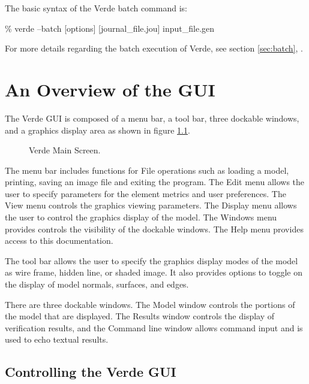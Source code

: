 \documentclass[10pt]{report}
\begin{document}
The basic syntax of the Verde batch command is:

\begin{center}
\% verde --batch [options] [journal\_file.jou] input\_file.gen 
\end{center}

For more details regarding the batch execution of Verde, see 
section \ref{sec:batch},
.


\chapter{An Overview of the GUI}
\label{sec:overview}

The Verde GUI is composed of a menu bar, a tool bar, three dockable 
windows, and a graphics display area as shown in figure \ref{fig:blank}.

\htmlrule
\begin{figure}[htb]
  \begin{center}
      {}
    \caption{Verde Main Screen.}
    \label{fig:blank}
  \end{center}
\end{figure}     
\htmlrule


The menu bar includes functions for File operations 
such as loading a model, printing, saving an image file and exiting the 
program.  The Edit menu allows the user to specify 
parameters for the element metrics and user preferences.  The View menu 
controls the graphics viewing parameters.  The  
Display menu allows the user to control the graphics 
display of the model.  The Windows menu 
provides controls the visibility of the dockable windows. 
The Help menu provides access to this 
documentation.


The tool bar allows the user to specify the graphics 
display modes of the model as wire frame, hidden line, or shaded 
image.  It also provides options to toggle on the display of model normals,
surfaces, and edges.

There are three dockable windows.  The Model window controls the portions
of the model that are displayed.  The Results window controls the display
of verification results, and the Command line window allows command input
and is used to echo textual results.


\section{Controlling the Verde GUI}
\label{sec:controlling}
\end{document}
